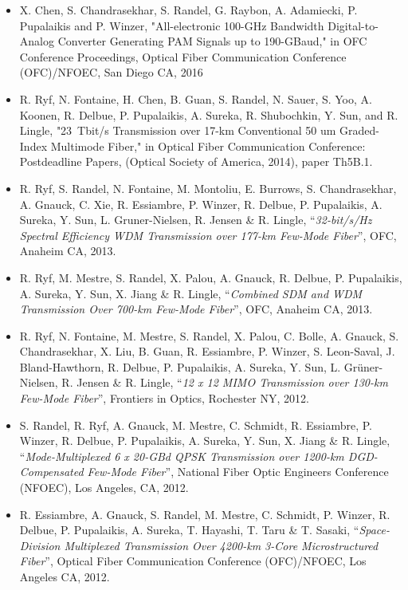 \documentclass[10pt,letterpaper]{extarticle}
\newenvironment{indentsection}[1]%
{\begin{list}{}%
	{\setlength{\leftmargin}{#1}}%
	\item[]%
}
{\end{list}}
\begin{document}
\begin{indentsection}{-1em}\begin{itemize}
\parskip=-0.2em
\item X. Chen, S. Chandrasekhar, S. Randel, G. Raybon, A. Adamiecki, P. Pupalaikis and P. Winzer, "All-electronic 100-GHz Bandwidth Digital-to-Analog Converter Generating PAM Signals up to 190-GBaud," in OFC Conference Proceedings, Optical Fiber Communication Conference (OFC)/NFOEC, San Diego CA, 2016
\item R. Ryf, N. Fontaine, H. Chen, B. Guan, S. Randel, N. Sauer, S. Yoo, A. Koonen, R. Delbue, P. Pupalaikis, A. Sureka, R. Shubochkin, Y. Sun, and R. Lingle, "23~Tbit/s Transmission over 17-km Conventional 50 um Graded-Index Multimode Fiber," in Optical Fiber Communication Conference: Postdeadline Papers,  (Optical Society of America, 2014), paper Th5B.1.
\item R. Ryf, S. Randel, N. Fontaine, M. Montoliu, E. Burrows, S. Chandrasekhar, A. Gnauck, C. Xie, R. Essiambre, P. Winzer, R. Delbue, P. Pupalaikis, A. Sureka, Y. Sun, L. Gruner-Nielsen, R. Jensen \& R. Lingle, “\emph{32-bit/s/Hz Spectral Efficiency WDM Transmission over 177-km Few-Mode Fiber}”, OFC, Anaheim CA, 2013.
\item R. Ryf, M. Mestre, S. Randel, X. Palou, A. Gnauck, R. Delbue, P. Pupalaikis, A. Sureka, Y. Sun, X. Jiang \& R. Lingle, “\emph{Combined SDM and WDM Transmission Over 700-km Few-Mode Fiber}”, OFC, Anaheim CA, 2013.
\item R. Ryf, N. Fontaine, M. Mestre, S. Randel, X. Palou, C. Bolle, A. Gnauck, S. Chandrasekhar, X. Liu, B. Guan, R. Essiambre, P. Winzer, S. Leon-Saval, J. Bland-Hawthorn, R. Delbue, P. Pupalaikis, A. Sureka, Y. Sun, L. Grüner-Nielsen, R. Jensen \& R. Lingle, “\emph{12 x 12 MIMO Transmission over 130-km Few-Mode Fiber}”, Frontiers in Optics, Rochester NY, 2012.
\item S. Randel, R. Ryf, A. Gnauck, M. Mestre, C. Schmidt, R. Essiambre, P. Winzer, R. Delbue, P. Pupalaikis, A. Sureka, Y. Sun, X. Jiang \& R. Lingle, “\emph{Mode-Multiplexed 6 x 20-GBd QPSK Transmission over 1200-km DGD-Compensated Few-Mode Fiber}”, National Fiber Optic Engineers Conference (NFOEC), Los Angeles, CA, 2012.
\item R. Essiambre, A. Gnauck, S. Randel, M. Mestre, C. Schmidt, P. Winzer, R. Delbue, P. Pupalaikis, A. Sureka, T. Hayashi, T. Taru \& T. Sasaki, “\emph{Space-Division Multiplexed Transmission Over 4200-km 3-Core Microstructured Fiber}”, Optical Fiber Communication Conference (OFC)/NFOEC, Los Angeles CA, 2012.

\end{itemize}
\end{indentsection}
\end{document}
